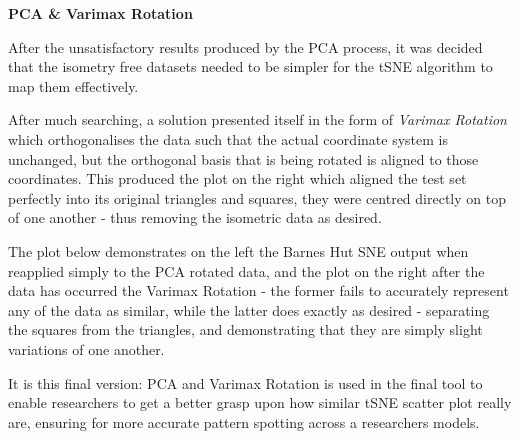 \documentclass[a4paper,11pt,titlepage]{article}
\begin{document}
	\textbf{PCA \& Varimax Rotation}
	\par
	After the unsatisfactory results produced by the PCA process, it was decided that the isometry free datasets needed to be simpler for the tSNE algorithm to map them effectively. 
	\par 
	After much searching, a solution presented itself in the form of \textit{Varimax Rotation} \cite{Lin2010} which orthogonalises the data such that the actual coordinate system is unchanged, but the orthogonal basis that is being rotated is aligned to those coordinates. This produced the plot on the right which aligned the test set perfectly into its original triangles and squares, they were centred directly on top of one another - thus removing the isometric data as desired.
	\par 
	The plot below demonstrates on the left the Barnes Hut SNE output when reapplied simply to the PCA rotated data, and the plot on the right after the data has occurred the Varimax Rotation - the former fails to accurately represent any of the data as similar, while the latter does exactly as desired - separating the squares from the triangles, and demonstrating that they are simply slight variations of one another.

	\begin{figure}[H]
    			\centering	
    			 \qquad
    			\caption{}%
    			\label{fig:pca_varimax}
	\end{figure}


	It is this final version: PCA and Varimax Rotation is used in the final tool to enable researchers to get a better grasp upon how similar tSNE scatter plot really are, ensuring for more accurate pattern spotting across a researchers models.
	
\end{document}
